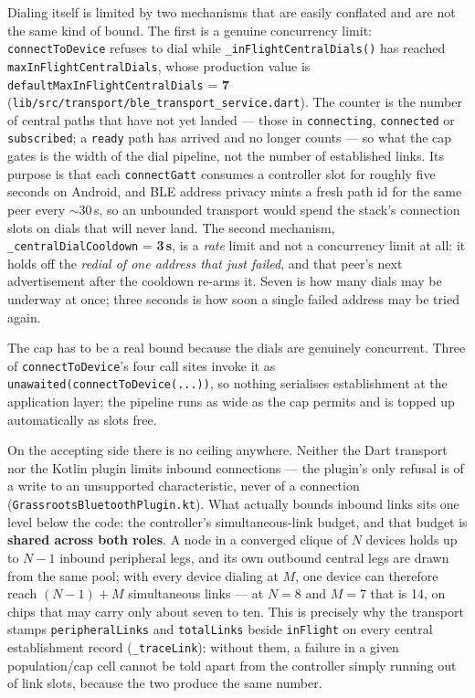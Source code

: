 \documentclass[11pt]{report}
\newcommand{\code}[1]{\texttt{\small #1}}
\begin{document}
Dialing itself is limited by two mechanisms that are easily conflated and are not the same kind of bound. The first is a genuine concurrency limit: \code{connectToDevice} refuses to dial while \code{\_inFlightCentralDials()} has reached \code{maxInFlightCentralDials}, whose production value is \code{defaultMaxInFlightCentralDials} = \textbf{7} (\code{lib/src/transport/ble\_transport\_service.dart}). The counter is the number of central paths that have not yet landed --- those in \code{connecting}, \code{connected} or \code{subscribed}; a \code{ready} path has arrived and no longer counts --- so what the cap gates is the width of the dial pipeline, not the number of established links. Its purpose is that each \code{connectGatt} consumes a controller slot for roughly five seconds on Android, and BLE address privacy mints a fresh path id for the same peer every ${\sim}30$\,s, so an unbounded transport would spend the stack's connection slots on dials that will never land. The second mechanism, \code{\_centralDialCooldown} = \textbf{3\,s}, is a \emph{rate} limit and not a concurrency limit at all: it holds off the \emph{redial of one address that just failed}, and that peer's next advertisement after the cooldown re-arms it. Seven is how many dials may be underway at once; three seconds is how soon a single failed address may be tried again.

The cap has to be a real bound because the dials are genuinely concurrent. Three of \code{connectToDevice}'s four call sites invoke it as \code{unawaited(connectToDevice(...))}, so nothing serialises establishment at the application layer; the pipeline runs as wide as the cap permits and is topped up automatically as slots free.

On the accepting side there is no ceiling anywhere. Neither the Dart transport nor the Kotlin plugin limits inbound connections --- the plugin's only refusal is of a write to an unsupported characteristic, never of a connection (\code{GrassrootsBluetoothPlugin.kt}). What actually bounds inbound links sits one level below the code: the controller's simultaneous-link budget, and that budget is \textbf{shared across both roles}. A node in a converged clique of $N$ devices holds up to $N-1$ inbound peripheral legs, and its own outbound central legs are drawn from the same pool; with every device dialing at $M$, one device can therefore reach $(N-1) + M$ simultaneous links --- at $N = 8$ and $M = 7$ that is 14, on chips that may carry only about seven to ten. This is precisely why the transport stamps \code{peripheralLinks} and \code{totalLinks} beside \code{inFlight} on every central establishment record (\code{\_traceLink}): without them, a failure in a given population/cap cell cannot be told apart from the controller simply running out of link slots, because the two produce the same number.
\end{document}
